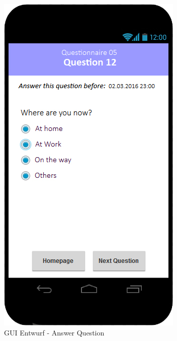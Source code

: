 \documentclass[a4paper]{scrreprt}
\begin{document}
                \vspace*{1cm}
                \begin{figure}[ht]
                    \centering
                    \includegraphics[scale = 0.3]{android_answer.jpg}
                    \caption{GUI Entwurf - Answer Question}
                \end{figure}





    \glsaddall
    \printglossary

    \listoffigures
\end{document}
